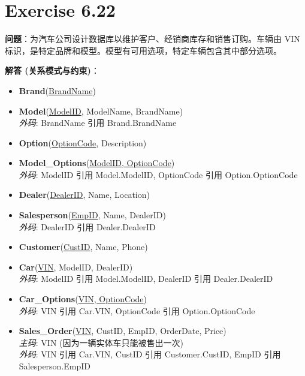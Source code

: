 \documentclass{article}
\begin{document}
\vspace{1cm}

\section*{Exercise 6.22}
\textbf{问题}：为汽车公司设计数据库以维护客户、经销商库存和销售订购。车辆由 VIN 标识，是特定品牌和模型。模型有可用选项，特定车辆包含其中部分选项。

\vspace{0.5cm}
\textbf{解答 (关系模式与约束)}：
\begin{itemize}
    \item \textbf{Brand}(\underline{BrandName})
    \item \textbf{Model}(\underline{ModelID}, ModelName, BrandName) \\
    \textit{外码}: BrandName 引用 Brand.BrandName
    \item \textbf{Option}(\underline{OptionCode}, Description)
    \item \textbf{Model\_Options}(\underline{ModelID, OptionCode}) \\
    \textit{外码}: ModelID 引用 Model.ModelID, OptionCode 引用 Option.OptionCode
    \item \textbf{Dealer}(\underline{DealerID}, Name, Location)
    \item \textbf{Salesperson}(\underline{EmpID}, Name, DealerID) \\
    \textit{外码}: DealerID 引用 Dealer.DealerID
    \item \textbf{Customer}(\underline{CustID}, Name, Phone)
    \item \textbf{Car}(\underline{VIN}, ModelID, DealerID) \\
    \textit{外码}: ModelID 引用 Model.ModelID, DealerID 引用 Dealer.DealerID
    \item \textbf{Car\_Options}(\underline{VIN, OptionCode}) \\
    \textit{外码}: VIN 引用 Car.VIN, OptionCode 引用 Option.OptionCode
    \item \textbf{Sales\_Order}(\underline{VIN}, CustID, EmpID, OrderDate, Price) \\
    \textit{主码}: VIN (因为一辆实体车只能被售出一次) \\
    \textit{外码}: VIN 引用 Car.VIN, CustID 引用 Customer.CustID, EmpID 引用 Salesperson.EmpID
\end{itemize}

\vspace{1cm}
\end{document}
